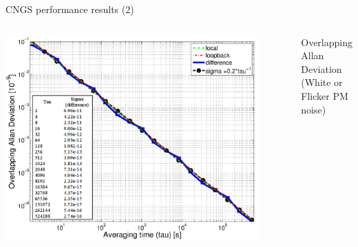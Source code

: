\documentclass[compress,red]{beamer}
\begin{document}
\begin{frame}{CNGS performance results (2)}

  \begin{columns}[c]
		\begin{center}
		\includegraphics[width=0.9\textwidth]{measurements/cngs_oADEV3.pdf}
		\end{center}
		\begin{center}
		  Overlapping Allan Deviation \\
		  (White or Flicker PM noise)
		\end{center}



\end{columns}
\end{frame}
\end{document}
